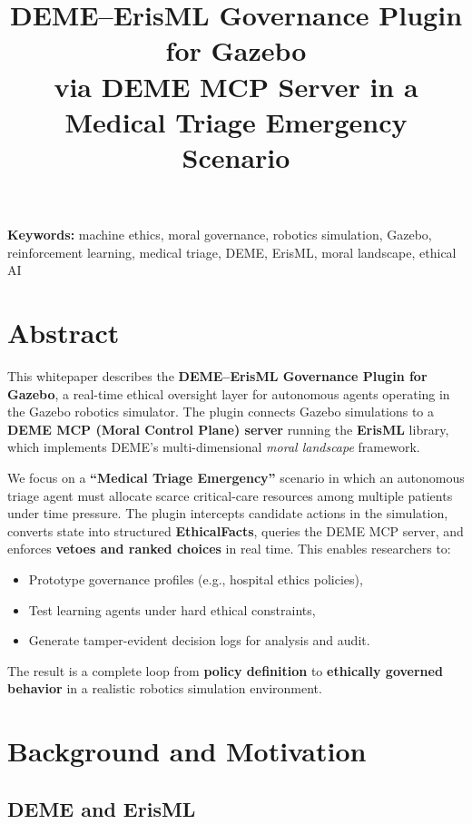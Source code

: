 \documentclass[11pt]{article}
\title{\textbf{DEME--ErisML Governance Plugin for Gazebo}\\[0.5em]
\large via DEME MCP Server in a Medical Triage Emergency Scenario}
\author{}
\date{}
\begin{document}
\maketitle

\noindent\textbf{Keywords:} machine ethics, moral governance, robotics simulation, Gazebo, reinforcement learning, medical triage, DEME, ErisML, moral landscape, ethical AI

\section{Abstract}

This whitepaper describes the \textbf{DEME--ErisML Governance Plugin for Gazebo}, a real-time ethical oversight layer for autonomous agents operating in the Gazebo robotics simulator. The plugin connects Gazebo simulations to a \textbf{DEME MCP (Moral Control Plane) server} running the \textbf{ErisML} library, which implements DEME's multi-dimensional \emph{moral landscape} framework.

We focus on a \textbf{``Medical Triage Emergency''} scenario in which an autonomous triage agent must allocate scarce critical-care resources among multiple patients under time pressure. The plugin intercepts candidate actions in the simulation, converts state into structured \textbf{EthicalFacts}, queries the DEME MCP server, and enforces \textbf{vetoes and ranked choices} in real time. This enables researchers to:

\begin{itemize}
  \item Prototype governance profiles (e.g., hospital ethics policies),
  \item Test learning agents under hard ethical constraints,
  \item Generate tamper-evident decision logs for analysis and audit.
\end{itemize}

The result is a complete loop from \textbf{policy definition} to \textbf{ethically governed behavior} in a realistic robotics simulation environment.

\section{Background and Motivation}

\subsection{DEME and ErisML}
\end{document}
